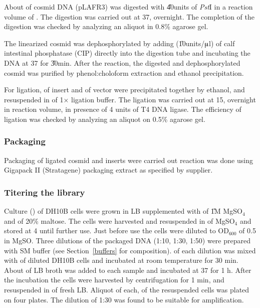 About  of cosmid DNA (pLAFR3) was digested with
\U{40}{units} of \emph{Pst}I in a reaction volume of .
The digestion was carried out at 37\dg{}, overnight. The
completion of the digestion was checked by analyzing an aliquot in
0.8\% agarose gel.

The linearized cosmid was dephosphorylated by adding 
(\U{10}{units/$\muup$l}) of calf intestinal phosphatase (CIP)
directly into the digestion tube and incubating the DNA at 37\dg{}
for \U{30}{min}. After the reaction, the digested and
dephosphorylated cosmid was purified by phenol:choloform
extraction and ethanol precipitation.

For ligation,  of insert and  of vector were
precipitated together by ethanol, and resuspended in  of
1$\times$ ligation buffer. The ligation was carried out at
15\dg{}, overnight in  reaction volume, in presence of 4
units of T4 DNA ligase. The efficiency of ligation was checked by
analyzing an aliquot on 0.5\% agarose gel.

\subsubsection{Packaging}

Packaging of ligated cosmid and inserts were carried out reaction
was done using Gigapack II (Stratagene) packaging extract as
specified by supplier.

\subsubsection{Titering the library}

Culture () of  DH10B cells were grown in LB
supplemented with  of \U{1}{M} MgSO$_{4}$ and 
of 20\% maltose. The cells were harvested and resuspended in
 of  MgSO$_{4}$ and stored at 4\dg{} until further
use. Just before use the cells were diluted to OD$_{600}$ of 0.5
in  MgSO. Three dilutions of the packaged DNA (1:10,
1:30, 1:50) were prepared with SM buffer (see
Section~\ref{buffers} for composition).  of each dilution
was mixed with  of diluted DH10B cells and incubated at
room temperature for 30 min. About  of LB broth was added
to each sample and incubated at 37\dg{} for 1 h. After the
incubation the cells were harvested by centrifugation for 1 min,
and resuspended in  of fresh LB\@. Aliquot of 
each, of the resuspended cells was plated on four plates. The
dilution of 1:30 was found to be suitable for amplification.


